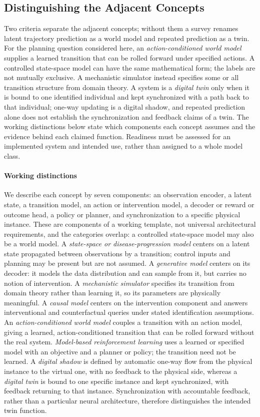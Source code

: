 \documentclass[journal]{IEEEtran}
\begin{document}
\subsection{Distinguishing the Adjacent Concepts}
Two criteria separate the adjacent concepts; without them a survey renames latent trajectory prediction as a world model and repeated prediction as a twin. For the planning question considered here, an \emph{action-conditioned world model} supplies a learned transition that can be rolled forward under specified actions. A controlled state-space model can have the same mathematical form; the labels are not mutually exclusive. A mechanistic simulator instead specifies some or all transition structure from domain theory. A system is a \emph{digital twin} only when it is bound to one identified individual and kept synchronized with a path back to that individual; one-way updating is a digital shadow, and repeated prediction alone does not establish the synchronization and feedback claims of a twin. The working distinctions below state which components each concept assumes and the evidence behind each claimed function. Readiness must be assessed for an implemented system and intended use, rather than assigned to a whole model class.

\paragraph{Working distinctions} We describe each concept by seven components: an observation encoder, a latent state, a transition model, an action or intervention model, a decoder or reward or outcome head, a policy or planner, and synchronization to a specific physical instance. These are components of a working template, not universal architectural requirements, and the categories overlap: a controlled state-space model may also be a world model. A \emph{state-space or disease-progression model} centers on a latent state propagated between observations by a transition; control inputs and planning may be present but are not assumed. A \emph{generative model} centers on its decoder: it models the data distribution and can sample from it, but carries no notion of intervention. A \emph{mechanistic simulator} specifies its transition from domain theory rather than learning it, so its parameters are physically meaningful. A \emph{causal model} centers on the intervention component and answers interventional and counterfactual queries under stated identification assumptions. An \emph{action-conditioned world model} couples a transition with an action model, giving a learned, action-conditioned transition that can be rolled forward without the real system. \emph{Model-based reinforcement learning} uses a learned or specified model with an objective and a planner or policy; the transition need not be learned. A \emph{digital shadow} is defined by automatic one-way flow from the physical instance to the virtual one, with no feedback to the physical side, whereas a \emph{digital twin} is bound to one specific instance and kept synchronized, with feedback returning to that instance. Synchronization with accountable feedback, rather than a particular neural architecture, therefore distinguishes the intended twin function.
\end{document}

